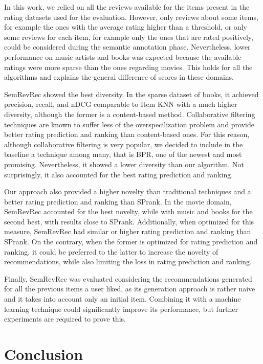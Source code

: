 In this work, we relied on all the reviews available for the items present in the rating datasets used for the evaluation. However, only reviews about some items, for example the ones with the average rating higher than a threshold, or only some reviews for each item, for example only the ones that are rated positively, could be considered during the semantic annotation phase. Nevertheless, lower performance on music artists and books was expected because the available ratings were more sparse than the ones regarding movies. This holds for all the algorithms and explains the general difference of scores in these domains. 

SemRevRec showed the best diversity. In the sparse dataset of books, it achieved precision, recall, and nDCG comparable to Item KNN with a much higher diversity, although the former is a content-based method. Collaborative filtering techniques are known to suffer less of the overspecilization problem and provide better rating prediction and ranking than content-based ones. For this reason, although collaborative filtering is very popular, we decided to include in the baseline a technique among many, that is BPR, one of the newest and most promising. Nevertheless, it showed a lower diversity than our algorithm. Not surprisingly, it also accounted for the best rating prediction and ranking. 

Our approach also provided a higher novelty than traditional techniques and a better rating prediction and ranking than SPrank. In the movie domain, SemRevRec accounted for the best novelty, while with music and books for the second best, with results close to SPrank. Additionally, when optimized for this measure, SemRevRec had similar or higher rating prediction and ranking than SPrank. On the contrary, when the former is optimized for rating prediction and ranking, it could be preferred to the latter to increase the novelty of recommendations, while also limiting the loss in rating prediction and ranking.

Finally, SemRevRec was evaluated considering the recommendations generated for all the previous items a user liked, as its generation approach is rather naive and it takes into account only an initial item. Combining it with a machine learning technique could significantly improve its performance, but further experiments are required to prove this.

\section{Conclusion}
\label{srr:sec:concl}


